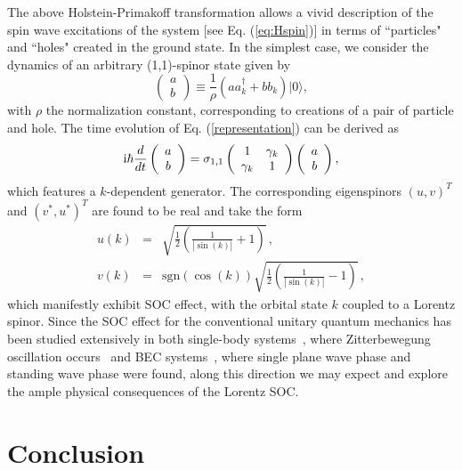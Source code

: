 \documentclass[pra,epsfig,rotate,superscriptaddress,showpacs]{revtex4}
\begin{document}
The above Holstein-Primakoff transformation allows a vivid description of the spin wave excitations of the system [see Eq. (\ref{eq:Hspin})] in terms of ``particles" and ``holes" created in the ground state. In the simplest case, we consider the dynamics of an arbitrary (1,1)-spinor state given by
 \begin{equation} \label{representation}
\left(\begin{array}{c}a \\b\end{array} \right)\equiv\frac{1}{\rho}(a a_k^\dag+b b_{k})|0\rangle,
\end{equation}
with $\rho$ the normalization constant, corresponding to creations of a pair of particle and hole. The time evolution of Eq. (\ref{representation}) can be derived as
\begin{equation}\label{eq:spinor}
{\text i}\hbar\frac{d}{dt}\left(\begin{array}{c}a \\b\end{array} \right)=\sigma_{1,1} \left(\begin{array}{cc}1&\gamma_k \\ \gamma_k&1\end{array} \right) \left(\begin{array}{c}a
\\b
\end{array} \right),
\end{equation}
which features a $k$-dependent generator. The corresponding eigenspinors  $(u,v)^T$ and $(v^*,u^*)^T$ are found to be real and take the form
\begin{eqnarray}  \label{eigensolution}
u(k)&=&\sqrt{\frac{1}{2}\left(\frac{1}{|\sin(k)|}+1\right)}\,, \\
v(k)&=&{\text {sgn}}(\cos(k))\sqrt{\frac{1}{2}\left(\frac{1}{|\sin(k)|}-1\right)}\,,
\end{eqnarray}
which manifestly exhibit SOC effect, with the orbital state $k$ coupled to a Lorentz spinor. Since the SOC effect for the conventional unitary quantum mechanics has been studied extensively in both single-body systems~\cite{ZB,Vaishnav,Ruseckas,Juzeliunas}, where Zitterbewegung oscillation occurs~\cite{ZB,Vaishnav} and BEC systems~\cite{Zhai}, where single plane wave phase and standing wave phase were found, along this direction we may expect and explore the ample physical consequences of the Lorentz SOC.


\section{Conclusion}
\end{document}
